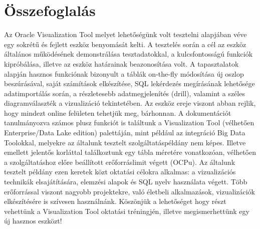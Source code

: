 \section{Összefoglalás}
Az Oracle Visualization Tool melyet lehetőségünk volt tesztelni alapjában véve egy sokrétű és fejlett eszköz benyomását kelti. A tesztelés során a cél az eszköz általános működésének demonstrálása tesztadatokkal, a kulcsfontosságú funkciók kipróbálása, illetve az eszköz határainak beazonosítása volt. A tapasztalatok alapján hasznos funkciónak bizonyult a táblák on-the-fly módosítása új oszlop beszúrásával, saját számítások elkészítése, SQL lekérdezés megírásának lehetősége adatimportálás során, a részletesebb adatmegjelenítés (drill), valamint a széles diagramválaszték a vizualizáció tekintetében. Az eszköz ereje viszont abban rejlik, hogy mindezt online felületen tehetjük meg, bárhonnan. A dokumentációt tanulmányozva számos plusz funkciót is találtunk a Visualization Tool (vélhetően Enterprise/Data Lake edition) palettáján, mint például az integráció Big Data Toolokkal, melyekre az általunk tesztelt szolgáltatáspéldány nem képes. Illetve emellett jelentős korláttal találkoztunk egy tábla méretére vonatkozóan, vélhetően a szolgáltatáshoz előre beállított erőforráslimit végett (OCPu). Az általunk tesztelt példány ezen keretek közt oktatási célokra alkalmas: a vizualizációs technikák elsajátítására, elemzési alapok és SQL nyelv használata végett. Több erőforrással viszont nagyobb projektekre, való életbeli alkalmazások, vizualizációk elkészítésére is szívesen használnánk. Köszönjük a lehetőséget hogy részt vehettünk a Visualization Tool oktatási tréningjén, illetve megismerhettünk egy új hasznos eszközt!